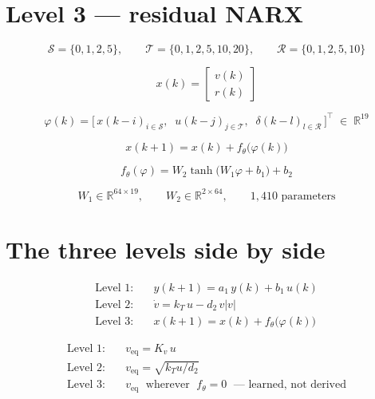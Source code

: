 \documentclass[11pt]{article}
\begin{document}
\section*{Level 3 — residual NARX}

\[
\mathcal{S} = \{0,1,2,5\},
\qquad
\mathcal{T} = \{0,1,2,5,10,20\},
\qquad
\mathcal{R} = \{0,1,2,5,10\}
\]

\[
x(k) = \begin{bmatrix} v(k) \\ r(k) \end{bmatrix}
\]

\[
\varphi(k) = \bigl[\,x(k-i)_{i\in\mathcal{S}},\;\;
                    u(k-j)_{j\in\mathcal{T}},\;\;
                    \delta(k-l)_{l\in\mathcal{R}}\,\bigr]^{\top}
\;\in\; \mathbb{R}^{19}
\]

\[
x(k+1) = x(k) + f_\theta\bigl(\varphi(k)\bigr)
\]

\[
f_\theta(\varphi) = W_2 \tanh\bigl(W_1 \varphi + b_1\bigr) + b_2
\]

\[
W_1 \in \mathbb{R}^{64\times 19},
\qquad
W_2 \in \mathbb{R}^{2\times 64},
\qquad
1{,}410 \text{ parameters}
\]

\section*{The three levels side by side}

\begin{align*}
\text{Level 1:}\quad & y(k+1) = a_1\,y(k) + b_1\,u(k) \\[4pt]
\text{Level 2:}\quad & \dot v = k_T\,u - d_2\,v|v| \\[4pt]
\text{Level 3:}\quad & x(k+1) = x(k) + f_\theta\bigl(\varphi(k)\bigr)
\end{align*}

\begin{align*}
\text{Level 1:}\quad & v_{\mathrm{eq}} = K_v\,u \\[4pt]
\text{Level 2:}\quad & v_{\mathrm{eq}} = \sqrt{k_T u / d_2} \\[4pt]
\text{Level 3:}\quad & v_{\mathrm{eq}} \;\text{ wherever }\; f_\theta = 0 \;\text{ — learned, not derived}
\end{align*}
\end{document}
